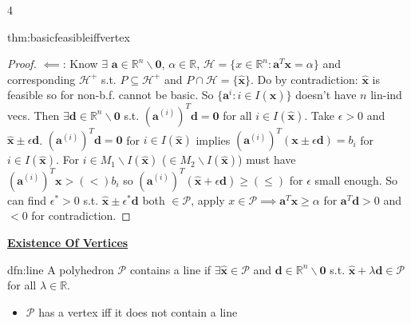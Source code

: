 \documentclass[landscape, 8pt]{extarticle}
\begin{document}
\begin{multicols*}{4}
\begin{thm}{thm:basicfeasibleiffvertex}{ }
\begin{proof}
				$\impliedby$: Know $\exists$ $\mathbf{a}\in \mathbb{R}^n \backslash\mathbf{0}$, $\alpha\in \mathbb{R}$, $\mathcal{H} = \{x\in \mathbb{R}^n : \mathbf{a}^T\mathbf{x} = \alpha\}$ and corresponding $\mathcal{H}^+$ s.t. $P \subseteq \mathcal{H}^+$ and $P \cap \mathcal{H} = \{\mathbf{\hat{x}}\}$. Do by contradiction: $\mathbf{\hat{x}}$ is feasible so for non-b.f. cannot be basic. So $\{\mathbf{a}^i : i\in I(\mathbf{\hat{x}})\}$ doesn't have $n$ lin-ind vecs. Then $\exists \mathbf{d}\in \mathbb{R}^n \backslash\mathbf{0}$ s.t. $(\mathbf{a}^{(i)})^T\mathbf{d} = \mathbf{0}$ for all $i\in I(\mathbf{\hat{x}})$. Take $\epsilon > 0$ and $\mathbf{\hat{x}} \pm\epsilon\mathbf{d}$. $(\mathbf{a}^{(i)})^T\mathbf{d} = \mathbf{0}$ for $i\in I(\mathbf{\hat{x}})$ implies $(\mathbf{a}^{(i)})^T(\mathbf{x} \pm\epsilon\mathbf{d}) = b_i$ for $i\in I(\mathbf{\hat{x}})$. For $i\in M_1\backslash I(\mathbf{\hat{x}})$ ($\in M_2\backslash I(\mathbf{\hat{x}})$) must have $(\mathbf{a}^{(i)})^T\mathbf{x} > (<) b_i$ so $(\mathbf{a}^{(i)})^T(\mathbf{\hat{x}} +\epsilon\mathbf{d}) \ge (\le)$ for $\epsilon$ small enough. So can find $\epsilon^* > 0$ s.t. $\mathbf{\hat{x}} \pm \epsilon^*\mathbf{d}$ both $\in \mathcal{P}$, apply $x\in \mathcal{P} \implies \mathbf{a}^T \mathbf{x} \ge \alpha$ for $\mathbf{a}^T\mathbf{d} >0$ and $<0$ for contradiction.
			\end{proof}
			
		\end{thm}
		
		
		
		{\tiny\textbf{\underline{Existence Of Vertices}}}
		
		
		\begin{dfn}[Lines]{dfn:line}{ }
			A polyhedron $\mathcal{P}$ contains a line if $\exists \mathbf{\hat{x}}\in \mathcal{P}$ and $\mathbf{d}\in \mathbb{R}^n \backslash \mathbf{0}$ s.t. $\mathbf{\hat{x}} + \lambda \mathbf{d}\in \mathcal{P}$ for all $\lambda\in \mathbb{R}$.
			\begin{itemize}
				\item $\mathcal{P}$ has a vertex iff it does not contain a line
				

\end{itemize}
\end{dfn}
\end{multicols*}
\end{document}
